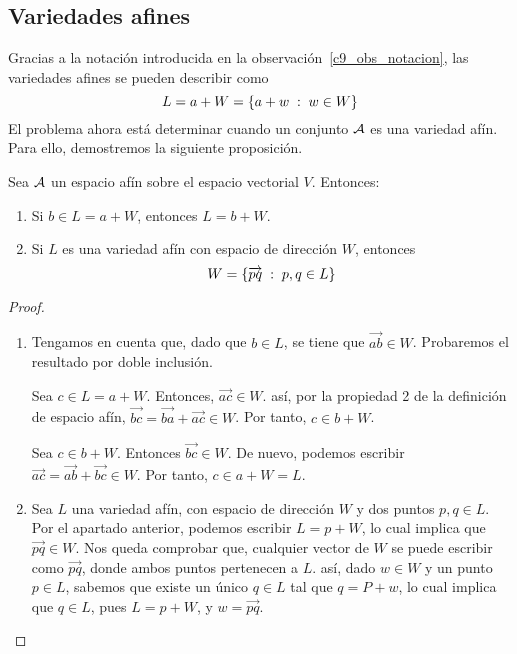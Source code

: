 \subsection{Variedades afines}
\begin{defi}
\end{defi}
Gracias a la notación introducida en la observación~\ref{c9_obs_notacion}, las variedades afines se pueden describir como
\begin{equation*}
	L=a+W=\{a+w\;:\; w\in W\}
\end{equation*}
El problema ahora está determinar cuando un conjunto $\mathcal{A}$ es una variedad afín. Para ello, demostremos la siguiente proposición.
\begin{prop}
	Sea $\mathcal{A}$ un espacio afín sobre el espacio vectorial $V$. Entonces:
	\begin{enumerate}
		\item Si $b\in L=a+W$, entonces $L=b+W$.
		\item Si $L$ es una variedad afín con espacio de dirección $W$, entonces
		\begin{equation}
		W=\{\overrightarrow{pq}\;:\; p,q\in L\}
		\end{equation}
	\end{enumerate}
\end{prop}
\begin{proof}
	\begin{enumerate}
		\item Tengamos en cuenta que, dado que $b\in L$, se tiene que $\overrightarrow{ab}\in W$. Probaremos el resultado por doble inclusión.
		
		Sea $c\in L=a+W$. Entonces, $\overrightarrow{ac}\in W$. así, por la propiedad 2 de la definición de espacio afín, $\overrightarrow{bc}=\overrightarrow{ba}+\overrightarrow{ac}\in W$. Por tanto, $c\in b+W$.
		
		Sea $c\in b+W$. Entonces $\overrightarrow{bc}\in W$. De nuevo, podemos escribir $\overrightarrow{ac}=\overrightarrow{ab}+\overrightarrow{bc}\in W$. Por tanto, $c\in a+W=L$.
		
		\item Sea $L$ una variedad afín, con espacio de dirección $W$ y dos puntos $p,q\in L$. Por el apartado anterior, podemos escribir $L=p+W$, lo cual implica que $\overrightarrow{pq}\in W$. Nos queda comprobar que, cualquier vector de $W$ se puede escribir como $\overrightarrow{pq}$, donde ambos puntos pertenecen a $L$. así, dado $w\in W$ y un punto $p\in L$, sabemos que existe un único $q\in L$ tal que $q=P+w$, lo cual implica que $q\in L$, pues $L=p+W$, y $w=\overrightarrow{pq}$.
	\end{enumerate}
\end{proof}
